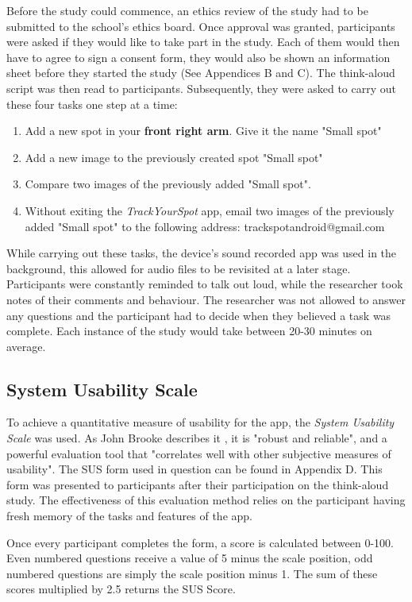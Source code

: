 Before the study could commence, an ethics review of the study had to be submitted to the school's ethics board. Once approval was granted, participants were asked if they would like to take part in the study. Each of them would then have to agree to sign a consent form, they would also be shown an information sheet before they started the study (See Appendices B and C). The think-aloud script was then read to participants. Subsequently, they were asked to carry out these four tasks one step at a time:
\begin{enumerate}
    \item Add a new spot in your \textbf{front right arm}. Give it the name "Small spot"
    \item Add a new image to the previously created spot "Small spot"
    \item Compare two images of the previously added "Small spot".
    \item Without exiting the \emph{TrackYourSpot} app, email two images of the previously added "Small spot" to the following address: trackspotandroid@gmail.com
\end{enumerate}
While carrying out these tasks, the device's sound recorded app was used in the background, this allowed for audio files to be revisited at a later stage. Participants were constantly reminded to talk out loud, while the researcher took notes of their comments and behaviour. The researcher was not allowed to answer any questions and the participant had to decide when they believed a task was complete. Each instance of the study would take between 20-30 minutes on average.

\subsection{System Usability Scale}
To achieve a quantitative measure of usability for the app, the \emph{System Usability Scale} was used. As John Brooke describes it \cite{brooke1996sus}, it is "robust and reliable", and a powerful evaluation tool that "correlates well with other subjective measures of usability". The SUS form used in question can be found in Appendix D. This form was presented to participants after their participation on the think-aloud study. The effectiveness of this evaluation method relies on the participant having fresh memory of the tasks and features of the app.

Once every participant completes the form, a score is calculated between 0-100. Even numbered questions receive a value of 5 minus the scale position, odd numbered questions are simply the scale position minus 1. The sum of these scores multiplied by 2.5 returns the SUS Score.

